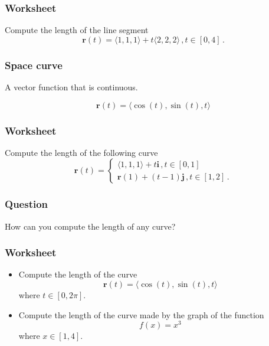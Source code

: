 \documentclass[aspectratio=169]{beamer}
\newcommand{\vect}{\mathbf}
\begin{document}
\begin{frame}
    \frametitle{Worksheet}
    Compute the length of the line segment
    \begin{equation*}
        \vect{r}(t) = \langle 1,1,1 \rangle + t \langle 2,2,2 \rangle \,, t\in [0, 4] \,.
    \end{equation*}
\end{frame}

\begin{frame}
    \frametitle{Space curve}
    A vector function that is continuous.

    \begin{example}
        \begin{equation*}
            \vect{r}(t) = \langle \cos(t), \sin(t), t \rangle
        \end{equation*}
    \end{example}
\end{frame}

\begin{frame}
    \frametitle{Worksheet}
    Compute the length of the following curve
    \begin{equation*}
        \vect{r}(t) = 
        \begin{cases}
            \langle 1,1,1 \rangle + t \vect{i} \,, t \in [0,1] \\
            \vect{r}(1) + (t-1) \vect{j} \,, t \in [1,2] \,.
        \end{cases}
    \end{equation*}
\end{frame}

\begin{frame}
    \frametitle{Question}
    How can you compute the length of any curve?
\end{frame}


\begin{frame}
    \frametitle{Worksheet}
    \begin{itemize}
        \item Compute the length of the curve
            $$\vect{r}(t) =  \langle \cos(t) ,\sin(t), t \rangle$$
            where $t\in [0,2\pi]$.
        \item Compute the length of the curve made by the graph of the function
    $$ f(x) = x^3 $$
    where $x \in [1,4]$.
    \end{itemize}
\end{frame}
\end{document}
